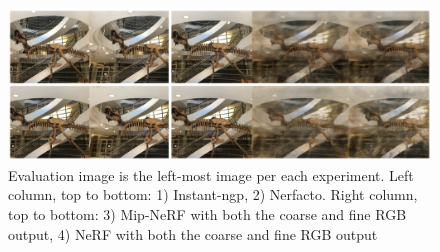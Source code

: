 \begin{figure}[h]
    \centering
    \includegraphics[width=1.0\textwidth]{figures/trex-result.png}
    \caption{Evaluation image is the left-most image per each experiment.
    Left column, top to bottom: 1) Instant-ngp, 2) Nerfacto. Right column, top to bottom: 3) Mip-NeRF with both the coarse and fine RGB output, 4) NeRF with both the coarse and fine RGB output}
    \label{fig:trex-result}
\end{figure}